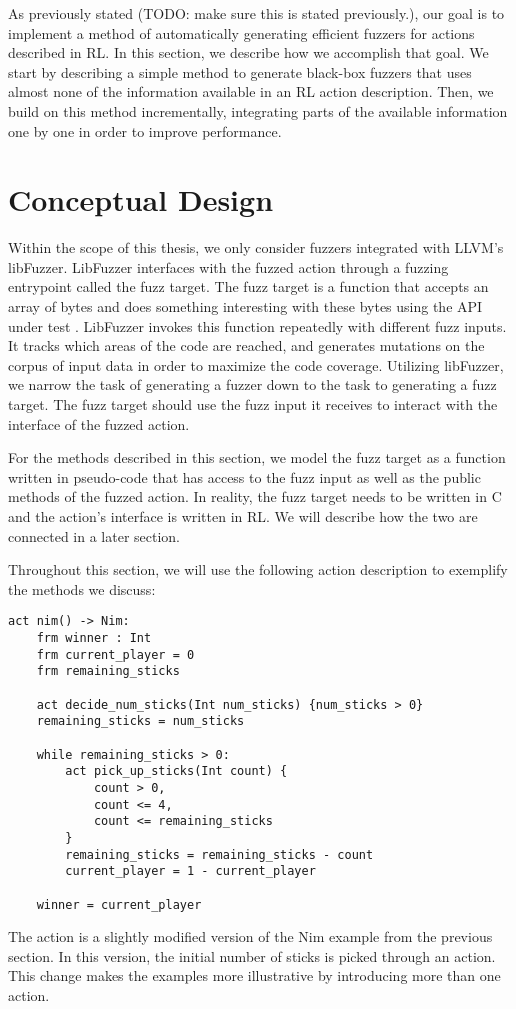 
As previously stated (TODO: make sure this is stated previously.), our goal is to implement a method of automatically generating
 efficient fuzzers for actions described in RL.
In this section, we describe how we accomplish that goal.
We start by describing a simple method to generate black-box fuzzers that uses almost none of the information available in an RL action description.
Then, we build on this method incrementally, integrating parts of the available information one by one in order to improve performance.

\section{Conceptual Design}
Within the scope of this thesis, we only consider fuzzers integrated with LLVM's libFuzzer.
LibFuzzer interfaces with the fuzzed action through a fuzzing entrypoint called the fuzz target.
The fuzz target is a function that accepts an array of bytes and does something interesting with these bytes using the API under test \cite{LibFuzzer}.
LibFuzzer invokes this function repeatedly with different fuzz inputs. It tracks which areas of the code are reached, and generates mutations on the corpus of input data in order to maximize the code coverage.
Utilizing libFuzzer, we narrow the task of generating a fuzzer down to the task to generating a fuzz target.
The fuzz target should use the fuzz input it receives to interact with the interface of the fuzzed action.

For the methods described in this section, we model the fuzz target as a function written in pseudo-code that has access to the fuzz input as well
 as the public methods of the fuzzed action.
In reality, the fuzz target needs to be written in C and the action's interface is written in RL. We will describe how the two are connected in a later section.

Throughout this section, we will use the following action description to exemplify the methods we discuss:
\begin{lstlisting}
act nim() -> Nim:
    frm winner : Int
    frm current_player = 0
    frm remaining_sticks

    act decide_num_sticks(Int num_sticks) {num_sticks > 0}
    remaining_sticks = num_sticks

    while remaining_sticks > 0:
        act pick_up_sticks(Int count) {
            count > 0,
            count <= 4,
            count <= remaining_sticks
        }
        remaining_sticks = remaining_sticks - count
        current_player = 1 - current_player

    winner = current_player
\end{lstlisting}
The action is a slightly modified version of the Nim example from the previous section.
In this version, the initial number of sticks is picked through an action. This change makes the examples more illustrative by introducing more than one action.

